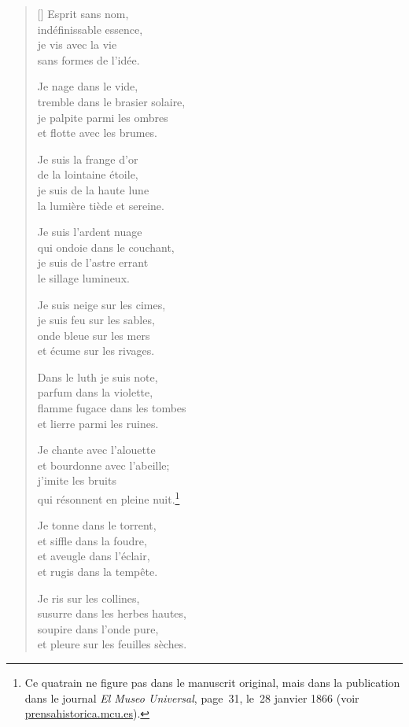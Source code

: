 \documentclass[a4paper,12pt]{book}
\begin{document}
\begin{verse}[\versewidth]
  Esprit sans nom, \\
  indéfinissable essence, \\
  je vis avec la vie \\
  sans formes de l'idée.

  Je nage dans le vide, \\
  tremble dans le brasier solaire, \\
  je palpite parmi les ombres \\
  et flotte avec les brumes.

  Je suis la frange d'or \\
  de la lointaine étoile, \\
  je suis de la haute lune \\
  la lumière tiède et sereine.

  Je suis l'ardent nuage \\
  qui ondoie dans le couchant, \\
  je suis de l'astre errant \\
  le sillage lumineux.

  Je suis neige sur les cimes, \\
  je suis feu sur les sables, \\
  onde bleue sur les mers \\
  et écume sur les rivages.

  Dans le luth je suis note, \\
  parfum dans la violette, \\
  flamme fugace dans les tombes \\
  et lierre parmi les ruines.

  Je chante avec l'alouette \\
  et bourdonne avec l'abeille; \\
  j'imite les bruits \\
  qui résonnent en pleine nuit.\footnote{Ce quatrain ne
figure pas dans le manuscrit original, mais dans la publication dans
le journal \emph{El Museo Universal}, page~31, le~28 janvier 1866 (voir \url{prensahistorica.mcu.es}).}

  Je tonne dans le torrent, \\
  et siffle dans la foudre, \\
  et aveugle dans l'éclair, \\
  et rugis dans la tempête.

  Je ris sur les collines, \\
  susurre dans les herbes hautes, \\
  soupire dans l'onde pure, \\
  et pleure sur les feuilles sèches.


\end{verse}
\end{document}
